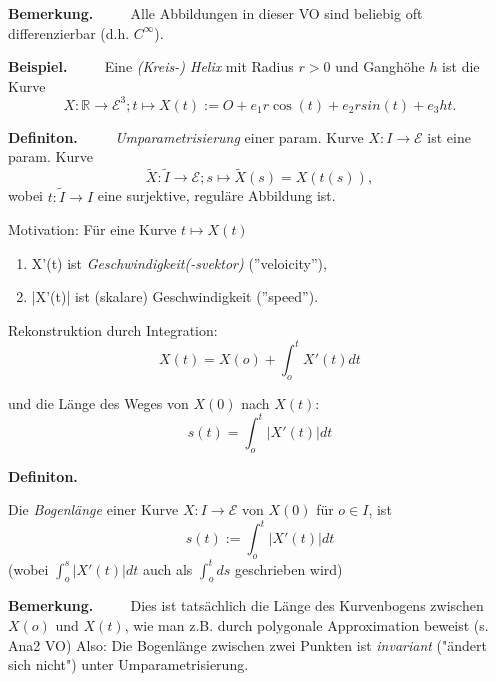 \documentclass[a4paper,oneside,11pt,DIV=12,parskip=half]{scrartcl}
\newcommand{\R}{\mathbb R}
\newenvironment{definition}{\textbf{Definiton.} ~~~~}{}
\newenvironment{note}{\textbf{Bemerkung.} ~~~~}{}
\newenvironment{example}{\textbf{Beispiel.} ~~~~}{}
\newenvironment{lemma, definition}{\textbf{Lemma und Definition.} ~~~~}{}
\newenvironment{note, example}{\textbf{Bemerkung und Beispiel.} ~~~~}{}
\begin{document}
\begin{note}
	Alle Abbildungen in dieser VO sind beliebig oft differenzierbar (d.h. $C^{\infty}$).
\end{note}

\begin{example}
	Eine \textit{(Kreis-) Helix} mit Radius $r>0$ und Ganghöhe $h$ ist die Kurve
	\[X: \R \rightarrow \mathcal{E}^3; t \mapsto X(t) := O + e_1r\cos(t) + e_2rsin(t) + e_3ht. \]
\end{example}

\begin{definition}
	\textit{Umparametrisierung} einer param. Kurve $X: I \rightarrow \mathcal{E}$ ist eine param. Kurve
	\[\widetilde{X}: \widetilde{I} \rightarrow \mathcal{E}; s \mapsto \widetilde{X}(s)=X(t(s)),\]
	wobei $t: \widetilde{I} \rightarrow I$ eine surjektive, reguläre Abbildung ist.

\end{definition}

Motivation: Für eine Kurve $t \mapsto X(t)$ 
\begin{enumerate}
	\item X'(t) ist \textit{Geschwindigkeit(-svektor)} (''veloicity''),
	\item |X'(t)| ist (skalare) Geschwindigkeit (''speed'').
\end{enumerate}

Rekonstruktion durch Integration:
\[X(t)= X(o) + \int_{o}^{t}X'(t)dt\]

und die Länge des Weges von $X(0)$ nach $X(t)$:
\[s(t) = \int_{o}^{t}|X'(t)|dt\]

\begin{definition}
	
	Die \textit{Bogenlänge} einer Kurve $X: I \rightarrow \mathcal{E}$ von $X(0)$ für $o \in I$, ist
	\[s(t) := \int_{o}^{t}|X'(t)|dt\] (wobei $\int_{o}^{s}|X'(t)|dt$ auch als $\int_{o}^{t} ds$ geschrieben wird)
	
\end{definition}

\begin{note}
	Dies ist tatsächlich die Länge des Kurvenbogens zwischen $X(o)$ und $X(t)$, wie man z.B. durch polygonale Approximation beweist (s. Ana2 VO)
	Also: Die Bogenlänge zwischen zwei Punkten ist \textit{invariant} ("ändert sich nicht")
	unter Umparametrisierung.
\end{note}
\end{document}

